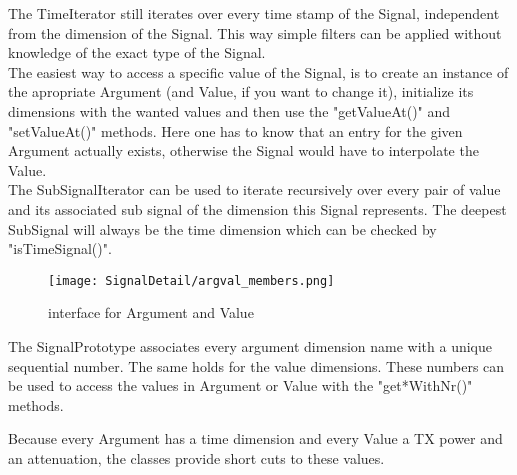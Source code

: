 The TimeIterator still iterates over every time stamp of the Signal, independent
from the dimension of the Signal. This way simple filters can be applied without
knowledge of the exact type of the Signal.\\

The easiest way to access a specific value of the Signal, is to create an 
instance of the apropriate Argument (and Value, if you want to change it),
initialize its dimensions with the wanted values and then use the "getValueAt()"
and "setValueAt()" methods. Here one has to know that an entry for the given
Argument actually exists, otherwise the Signal would have to interpolate the
Value.\\

The SubSignalIterator can be used to iterate recursively over every pair of 
value and its associated sub signal of the dimension this Signal represents. The
deepest SubSignal will always be the time dimension which can be checked by
"isTimeSignal()".

\begin{figure}[H]
 \centering
 \texttt{[image: SignalDetail/argval\_members.png]}
 \caption{interface for Argument and Value}
 \label{fig: arg and val members}
\end{figure}

The SignalPrototype associates every argument dimension name with a unique 
sequential number. The same holds for the value dimensions. These numbers can be
used to access the values in Argument or Value with the 
"get*WithNr()" methods.

Because every Argument has a time dimension and every Value a TX power and an 
attenuation, the classes provide short cuts to these values.
